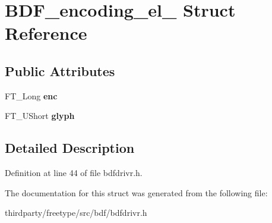 \hypertarget{struct_b_d_f__encoding__el__}{}\section{B\+D\+F\+\_\+encoding\+\_\+el\+\_\+ Struct Reference}
\label{struct_b_d_f__encoding__el__}
\subsection*{Public Attributes}
\begin{DoxyCompactItemize}
\item 
\mbox{\label{struct_b_d_f__encoding__el___ae3c66cb3ed3eca479edc8bbc9e7dcc85}} 
F\+T\+\_\+\+Long {\bfseries enc}
\item 
\mbox{\label{struct_b_d_f__encoding__el___ac8c8053f00957865bd002a48420db181}} 
F\+T\+\_\+\+U\+Short {\bfseries glyph}
\end{DoxyCompactItemize}


\subsection{Detailed Description}


Definition at line 44 of file bdfdrivr.\+h.



The documentation for this struct was generated from the following file\+:\begin{DoxyCompactItemize}
\item 
thirdparty/freetype/src/bdf/bdfdrivr.\+h\end{DoxyCompactItemize}
